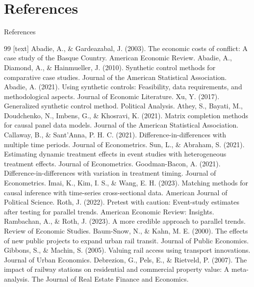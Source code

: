 \documentclass[aspectratio=169,11pt]{beamer}
\begin{document}
\section{References}
\begin{frame}[allowframebreaks]{References}
  \scriptsize
  \begin{thebibliography}{99}
    [text]
     Abadie, A., \& Gardeazabal, J. (2003). The economic costs of conflict: A case study of the Basque Country. American Economic Review.
     Abadie, A., Diamond, A., \& Hainmueller, J. (2010). Synthetic control methods for comparative case studies. Journal of the American Statistical Association.
     Abadie, A. (2021). Using synthetic controls: Feasibility, data requirements, and methodological aspects. Journal of Economic Literature.
     Xu, Y. (2017). Generalized synthetic control method. Political Analysis.
     Athey, S., Bayati, M., Doudchenko, N., Imbens, G., \& Khosravi, K. (2021). Matrix completion methods for causal panel data models. Journal of the American Statistical Association.
     Callaway, B., \& Sant'Anna, P. H. C. (2021). Difference-in-differences with multiple time periods. Journal of Econometrics.
     Sun, L., \& Abraham, S. (2021). Estimating dynamic treatment effects in event studies with heterogeneous treatment effects. Journal of Econometrics.
     Goodman-Bacon, A. (2021). Difference-in-differences with variation in treatment timing. Journal of Econometrics.
     Imai, K., Kim, I. S., \& Wang, E. H. (2023). Matching methods for causal inference with time-series cross-sectional data. American Journal of Political Science.
     Roth, J. (2022). Pretest with caution: Event-study estimates after testing for parallel trends. American Economic Review: Insights.
     Rambachan, A., \& Roth, J. (2023). A more credible approach to parallel trends. Review of Economic Studies.
     Baum-Snow, N., \& Kahn, M. E. (2000). The effects of new public projects to expand urban rail transit. Journal of Public Economics.
     Gibbons, S., \& Machin, S. (2005). Valuing rail access using transport innovations. Journal of Urban Economics.
     Debrezion, G., Pels, E., \& Rietveld, P. (2007). The impact of railway stations on residential and commercial property value: A meta-analysis. The Journal of Real Estate Finance and Economics.

\end{thebibliography}
\end{frame}
\end{document}
